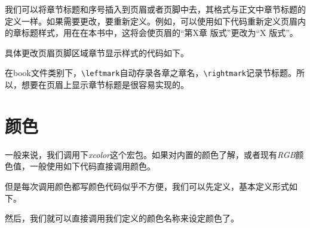 我们可以将章节标题和序号插入到页眉或者页脚中去，其格式与正文中章节标题的定义一样。如果需要更改，要重新定义。例如，可以使用如下代码重新定义页眉内的章标题样式，用在在本书中，这将会使页眉的“第X章 版式”更改为“X 版式”。 

具体更改页眉页脚区域章节显示样式的代码如下。

\begin{latex}
\renewcommand{\chaptermark}[1]{\markleft{\thesection.\#1}}
\renewcommand{\chaptermark}[1]{\markboth{\thechapter.\ #1}{节样式空置表示修改章样式}}
\renewcommand{\chaptermark}[1]{\markboth{章样式}{节样式}}
\end{latex}

在book文件类别下，\lstinline|\leftmark|自动存录各章之章名，\lstinline|\rightmark|记录节标题。所以，想要在页眉上显示章节标题是很容易实现的。

\begin{latex}
\lhead{\leftmark}%
\rhead{\rightmark}%
\end{latex}

\section{颜色}
一般来说，我们调用下\emph{xcolor}这个宏包。如果对内置的颜色了解，或者现有\emph{RGB}颜色值，一般使用如下代码直接调用颜色。

\begin{center}
\color[RGB]{204, 128, 92}{Color Text中文测试}
\end{center}

\begin{latex}
\color[RGB]{204, 128, 92}{Color Text中文测试}
\end{latex}

但是每次调用颜色都写颜色代码似乎不方便，我们可以先定义，基本定义形式如下。
\begin{latex}
\usepackage{xcolor}%
\end{latex}

然后，我们就可以直接调用我们定义的颜色名称来设定颜色了。

\begin{center}
\end{center}

